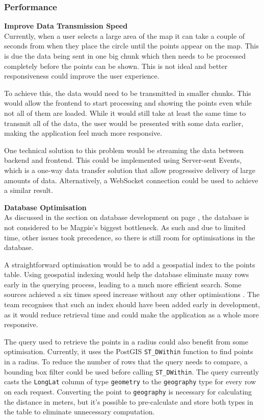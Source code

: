 \subsubsection{Performance}
\textbf{Improve Data Transmission Speed}\\
Currently, when a user selects a large area of the map it can take a couple of
seconds from when they place the circle until the points appear on the map. This
is due the data being sent in one big chunk which then needs to be processed
completely before the points can be shown. This is not ideal and better
responsiveness could improve the user experience.

To achieve this, the data would need to be transmitted in smaller chunks. This
would allow the frontend to start processing and showing the points even while
not all of them are loaded. While it would still take at least the same time to
transmit all of the data, the user would be presented with some data earlier,
making the application feel much more responsive.

One technical solution to this problem would be streaming the data between
backend and frontend. This could be implemented using Server{-}sent Events,
which is a one{-}way data transfer solution that allow progressive delivery of
large amounts of data. Alternatively, a WebSocket connection could be used to
achieve a similar result.

\textbf{Database Optimisation}\\
As discussed in the section on database development on page
\pageref{database_development}, the database is not considered to be Magpie's
biggest bottleneck. As such and due to limited time, other issues took
precedence, so there is still room for optimisations in the database.

A straightforward optimisation would be to add a geospatial index to the points
table. Using geospatial indexing would help the database eliminate many rows
early in the querying process, leading to a much more efficient search. Some
sources achieved a six times speed increase without any other optimisations
\cite{postgis_indexing}. The team recognises that such an index should have been
added early in development, as it would reduce retrieval time and could make the
application as a whole more responsive.

The query used to retrieve the points in a radius could also benefit from some
optimisation. Currently, it uses the PostGIS \texttt{ST\_DWithin} function to
find points in a radius. To reduce the number of rows that the query needs to
compare, a bounding box filter could be used before calling
\texttt{ST\_DWithin}. The query currently casts the \texttt{LongLat} column of
type \texttt{geometry} to the \texttt{geography} type for every row on each
request. Converting the point to \texttt{geography} is necessary for calculating
the distance in meters, but it's possible to pre{-}calculate and store both
types in the table to eliminate unnecessary computation.

